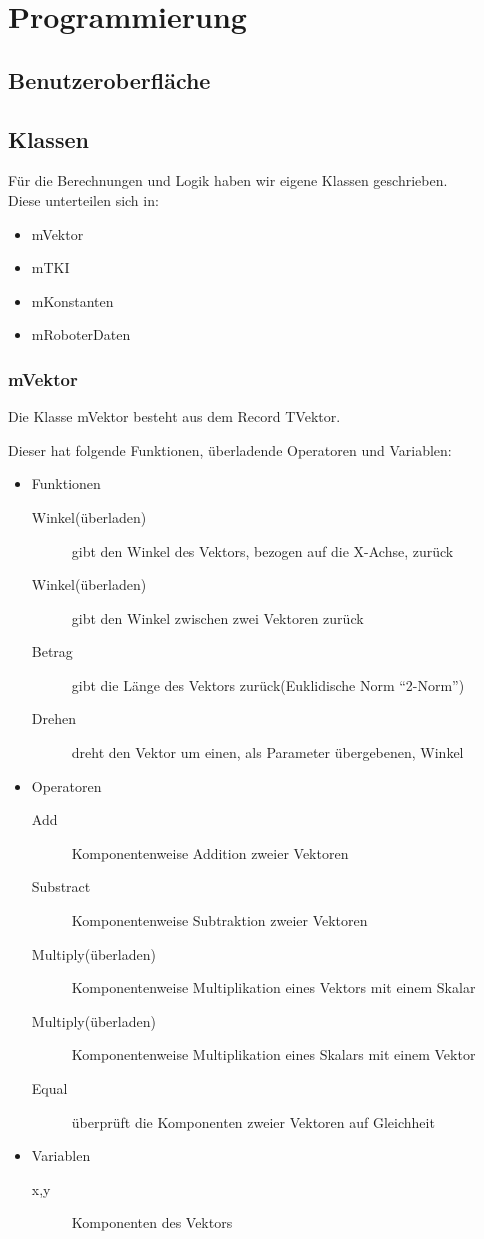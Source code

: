 \section{Programmierung}

\subsection{Benutzeroberfläche}

\subsection{Klassen}
Für die Berechnungen und Logik haben wir eigene Klassen geschrieben.\\
\newline
Diese unterteilen sich in:
\begin{itemize}
	\item mVektor
	\item mTKI
	\item mKonstanten
	\item mRoboterDaten
\end{itemize}

\subsubsection{mVektor}
Die Klasse mVektor besteht aus dem Record TVektor.

Dieser hat folgende Funktionen, überladende Operatoren und Variablen:
\begin{itemize}
	\item Funktionen
	\begin{description}
		\item[Winkel(überladen)] gibt den Winkel des Vektors, bezogen auf die X-Achse, zurück
		\item[Winkel(überladen)] gibt den Winkel zwischen zwei Vektoren zurück
		\item[Betrag] gibt die Länge des Vektors zurück(Euklidische Norm "`2-Norm"')
		\item[Drehen] dreht den Vektor um einen, als Parameter übergebenen, Winkel
	\end{description}
	\item Operatoren
	\begin{description}
		\item[Add] Komponentenweise Addition zweier Vektoren
		\item[Substract] Komponentenweise Subtraktion zweier Vektoren
		\item[Multiply(überladen)] Komponentenweise Multiplikation eines Vektors mit einem Skalar
		\item[Multiply(überladen)] Komponentenweise Multiplikation eines Skalars mit einem Vektor
		\item[Equal] überprüft die Komponenten zweier Vektoren auf Gleichheit
	\end{description}
	\item Variablen
	\begin{description}
		\item[x,y] Komponenten des Vektors
	\end{description}
\end{itemize}

